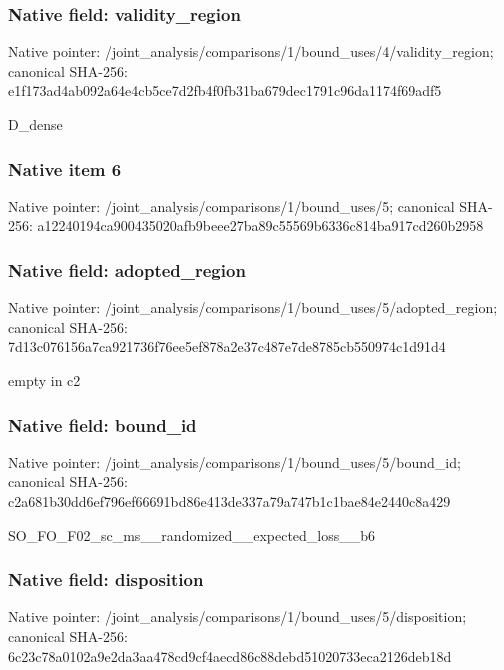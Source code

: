 \documentclass[10pt,a4paper]{article}
\begin{document}
\subsubsection{Native field: validity\_\allowbreak{}region}
Native pointer: /joint\_\allowbreak{}analysis/comparisons/1/bound\_\allowbreak{}uses/4/validity\_\allowbreak{}region; canonical SHA-256: e1f173ad4ab092a64e4cb5ce7d2fb4f0fb31ba679dec1791c96da1174f69adf5

\begingroup\raggedright\sloppy D\_\allowbreak{}dense\par\endgroup

\subsubsection{Native item 6}
Native pointer: /joint\_\allowbreak{}analysis/comparisons/1/bound\_\allowbreak{}uses/5; canonical SHA-256: a12240194ca900435020afb9beee27ba89c55569b6336c814ba917cd260b2958

\subsubsection{Native field: adopted\_\allowbreak{}region}
Native pointer: /joint\_\allowbreak{}analysis/comparisons/1/bound\_\allowbreak{}uses/5/adopted\_\allowbreak{}region; canonical SHA-256: 7d13c076156a7ca921736f76ee5ef878a2e37c487e7de8785cb550974c1d91d4

\begingroup\raggedright\sloppy empty in c2\par\endgroup

\subsubsection{Native field: bound\_\allowbreak{}id}
Native pointer: /joint\_\allowbreak{}analysis/comparisons/1/bound\_\allowbreak{}uses/5/bound\_\allowbreak{}id; canonical SHA-256: c2a681b30dd6ef796ef66691bd86e413de337a79a747b1c1bae84e2440c8a429

\begingroup\raggedright\sloppy SO\_\allowbreak{}FO\_\allowbreak{}F02\_\allowbreak{}sc\_\allowbreak{}ms\_\allowbreak{}\_\allowbreak{}randomized\_\allowbreak{}\_\allowbreak{}expected\_\allowbreak{}loss\_\allowbreak{}\_\allowbreak{}b6\par\endgroup

\subsubsection{Native field: disposition}
Native pointer: /joint\_\allowbreak{}analysis/comparisons/1/bound\_\allowbreak{}uses/5/disposition; canonical SHA-256: 6c23c78a0102a9e2da3aa478cd9cf4aecd86c88debd51020733eca2126deb18d
\end{document}
